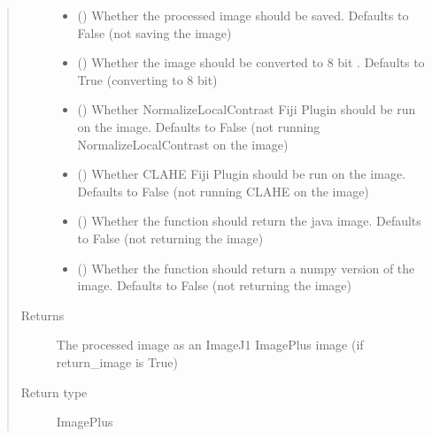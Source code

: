 \documentclass[letterpaper,10pt,english]{sphinxmanual}
\begin{document}
\begin{fulllineitems}
\begin{fulllineitems}
\begin{quote}
\begin{description}
\begin{itemize}
\item {} 
 () \textendash{} Whether the processed image should be saved. Defaults to False (not saving the image)

\item {} 
 () \textendash{} Whether the image should be converted to 8 bit . Defaults to True (converting to 8 bit)

\item {} 
 () \textendash{} Whether NormalizeLocalContrast Fiji Plugin should be run on the image.
Defaults to False (not running NormalizeLocalContrast on the image)

\item {} 
 () \textendash{} Whether CLAHE Fiji Plugin should be run on the image. Defaults to False (not running
CLAHE on the image)

\item {} 
 () \textendash{} Whether the function should return the java image. Defaults to False (not returning
the image)

\item {} 
 () \textendash{} Whether the function should return a numpy version of the image. Defaults to False
(not returning the image)

\end{itemize}

\item[{Returns}] \leavevmode
The processed image as an ImageJ1 ImagePlus image (if return\_image is True)

\item[{Return type}] \leavevmode
ImagePlus

\end{description}\end{quote}

\end{fulllineitems}



\end{fulllineitems}
\end{document}
